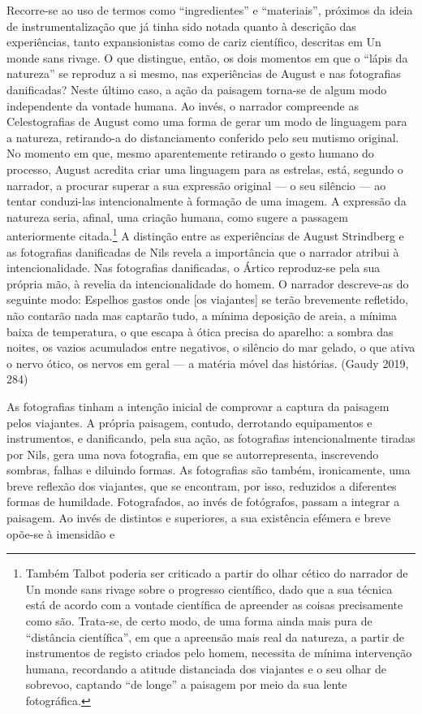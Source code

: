 \documentclass{article}
\begin{document}
Recorre-se ao uso de termos como “ingredientes” e “materiais”, próximos da ideia de
instrumentalização que já tinha sido notada quanto à descrição das experiências,
tanto expansionistas como de cariz científico, descritas em Un monde sans rivage. O
que distingue, então, os dois momentos em que o “lápis da natureza” se reproduz a
si mesmo, nas experiências de August e nas fotografias danificadas? Neste último
caso, a ação da paisagem torna-se de algum modo independente da vontade humana.
Ao invés, o narrador compreende as Celestografias de August como uma forma de
gerar um modo de linguagem para a natureza, retirando-a do distanciamento conferido pelo seu mutismo original. No momento em que, mesmo aparentemente retirando o gesto humano do processo, August acredita criar uma linguagem para as
estrelas, está, segundo o narrador, a procurar superar a sua expressão original — o
seu silêncio — ao tentar conduzi-las intencionalmente à formação de uma imagem.
A expressão da natureza seria, afinal, uma criação humana, como sugere a passagem
anteriormente citada.\footnote{Também Talbot poderia ser criticado a partir do olhar cético do narrador de Un monde sans rivage sobre
o progresso científico, dado que a sua técnica está de acordo com a vontade científica de apreender as
coisas precisamente como são. Trata-se, de certo modo, de uma forma ainda mais pura de “distância
científica”, em que a apreensão mais real da natureza, a partir de instrumentos de registo criados pelo
homem, necessita de mínima intervenção humana, recordando a atitude distanciada dos viajantes e o seu
olhar de sobrevoo, captando “de longe” a paisagem por meio da sua lente fotográfica.} A distinção entre as experiências de August Strindberg e as
fotografias danificadas de Nils revela a importância que o narrador atribui à intencionalidade. Nas fotografias danificadas, o Ártico reproduz-se pela sua própria mão,
à revelia da intencionalidade do homem. O narrador descreve-as do seguinte modo:
Espelhos gastos onde [os viajantes] se terão brevemente refletido, não contarão
nada mas captarão tudo, a mínima deposição de areia, a mínima baixa de temperatura, o que escapa à ótica precisa do aparelho: a sombra das noites, os vazios
acumulados entre negativos, o silêncio do mar gelado, o que ativa o nervo ótico,
os nervos em geral — a matéria móvel das histórias. (Gaudy 2019, 284)

As fotografias tinham a intenção inicial de comprovar a captura da paisagem pelos
viajantes. A própria paisagem, contudo, derrotando equipamentos e instrumentos, e
danificando, pela sua ação, as fotografias intencionalmente tiradas por Nils, gera
uma nova fotografia, em que se autorrepresenta, inscrevendo sombras, falhas e diluindo formas. As fotografias são também, ironicamente, uma breve reflexão dos viajantes, que se encontram, por isso, reduzidos a diferentes formas de humildade.
Fotografados, ao invés de fotógrafos, passam a integrar a paisagem. Ao invés de distintos e superiores, a sua existência efémera e breve opõe-se à imensidão e
\end{document}
